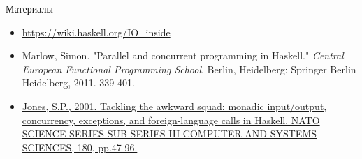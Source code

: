     \begin{frame}[fragile]{Материалы}
        \begin{itemize}
            \item {\color{blue} \url{https://wiki.haskell.org/IO_inside}}
            \item {\color{blue}Marlow, Simon. "Parallel and concurrent programming in Haskell." \textit{Central European Functional Programming School}. Berlin, Heidelberg: Springer Berlin Heidelberg, 2011. 339-401.}
            \item \href{https://citeseerx.ist.psu.edu/document?repid=rep1&type=pdf&doi=2e6c9d76f9cb690dc18019fc894ba9572a8c2812}{\color{blue} Jones, S.P., 2001. Tackling the awkward squad: monadic input/output, concurrency, exceptions, and foreign-language calls in Haskell. NATO SCIENCE SERIES SUB SERIES III COMPUTER AND SYSTEMS SCIENCES, 180, pp.47-96.}
        \end{itemize}
    \end{frame}


